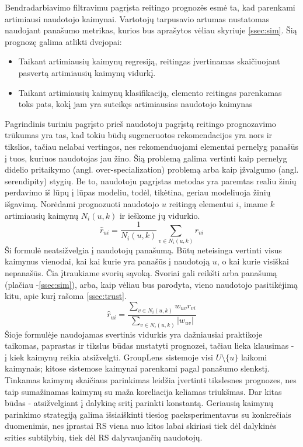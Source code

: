 \documentclass{VUMIFInfMagistrinis}
\begin{document}
Bendradarbiavimo filtravimu pagrįsta reitingo prognozės esmė ta, kad parenkami artimiausi naudotojo kaimynai. Vartotojų tarpusavio artumas nustatomas naudojant panašumo metrikas, kurios bus aprašytos vėliau skyriuje \ref{ssec:sim}. Šią prognozę galima atlikti dvejopai:
\begin{itemize}
	\item Taikant artimiausių kaimynų regresiją, reitingas įvertinamas skaičiuojant pasvertą artimiausių kaimynų vidurkį.
	\item Taikant artimiausių kaimynų klasifikaciją, elemento reitingas parenkamas toks pats, kokį jam yra suteikęs artimiausias naudotojo kaimynas
\end{itemize}

\indent
Pagrindinis turiniu pagrįsto prieš naudotoju pagrįstą reitingo prognozavimo trūkumas yra tas, kad tokiu būdų sugeneruotos rekomendacijos yra nors ir tikslios, tačiau nelabai vertingos, nes rekomenduojami elementai pernelyg panašūs į tuos, kuriuos naudotojas jau žino. Šią problemą galima vertinti kaip pernelyg didelio pritaikymo (angl. over-specialization) problemą arba kaip įžvalgumo (angl. serendipity) stygių. Be to, naudotoju pagrįstas metodas yra paremtas realiu žinių perdavimo iš lūpų į lūpas modeliu, todėl, tikėtina, geriau modeliuoja žinių išgavimą.
\newline
\indent
Norėdami prognozuoti naudotojo $u$ reitingą elementui $i$, imame $k$ artimiausių kaimynų $N_i(u, k)$ ir ieškome jų vidurkio.
\begin{equation}
\hat{r}_{ui} = \frac{1}{N_i(u, k)}\sum \limits_{v \in N_i(u, k)} r_{vi}
\end{equation}
Ši formulė neatsižvelgia į naudotojų panašumą. Būtų neteisinga vertinti visus kaimynus vienodai, kai kai kurie yra panašūs į naudotoją $u$, o kai kurie visiškai nepanašūs. Čia įtraukiame svorių sąvoką. Svoriai gali reikšti arba panašumą (plačiau -\ref{ssec:sim}), arba, kaip vėliau bus parodyta, vieno naudotojo pasitikėjimą kitu, apie kurį rašoma \ref{ssec:trust}.
\begin{equation}\label{eq:1}
\hat{r}_{ui} = \frac{\sum \limits_{v \in N_i(u, k)} w_{uv} r_{vi}}{\sum \limits_{v \in N_i(u, k)} |w_{uv}|}
\end{equation}
Šioje formulėje naudojamas svertinis vidurkis yra dažniausiai praktikoje taikomas, paprastas ir tikslus būdas nustatyti prognozei, tačiau lieka klausimas - į kiek kaimynų reikia atsižvelgti. GroupLens sistemoje visi $U \setminus \{u\}$ laikomi kaimynais; kitose sistemose kaimynai parenkami pagal panašumo slenkstį. Tinkamas kaimynų skaičiaus parinkimas leidžia įvertinti tikslesnes prognozes, nes taip sumažinamas kaimynų su maža koreliacija keliamas triukšmas. Dar kitas būdas - atsižvelgiant į dalykinę sritį parinkti konstantą. Geriausią kaimynų parinkimo strategiją galima išsiaiškinti tiesiog paeksperimentavus su konkrečiais duomenimis, nes įprastai RS viena nuo kitos labai skiriasi tiek dėl dalykinės srities subtilybių, tiek dėl RS dalyvaujančių naudotojų.  
\end{document}
